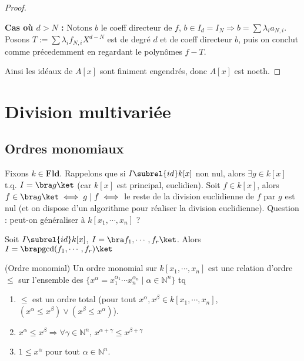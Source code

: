 \begin{proof}
\begin{enumerate}
                \textbf{Cas où $d > N$ :} Notons $b$ le coeff directeur de $f$, $b \in I_d = I_N \Rightarrow b = \sum \lambda_i a_{N,i}$. Posons $T := \sum \lambda_i f_{N,i}X^{d-N}$ est de degré $d$ et de coeff directeur $b$, puis on conclut comme précedemment en regardant le polynômes $f - T$.
            \end{enumerate}
            Ainsi les idéaux de $A[x]$ sont finiment engendrés, donc $A[x]$ est noeth.
        \end{proof}

    \section{Division multivariée}
        \subsection{Ordres monomiaux}
            Fixons $k \in \mathbf{Fld}$. Rappelons que si $I \subrel{id} k[x]$ non nul, alors $\exists g \in k[x]$ t.q. $I = \bra g \ket$ (car $k[x]$ est principal, euclidien). Soit $f \in k[x]$, alors $f \in \bra g \ket \iff g \mid f \iff $ le reste de la division euclidienne de $f$ par $g$ est nul (et on dispose d'un algorithme pour réaliser la division euclidienne). Question : peut-on généraliser à $k[x_1, \cdots, x_n]$ ? 
            \begin{remq}
                Soit $I \subrel{id} k[x]$, $I = \bra f_1, \cdots, f_r \ket$. Alors $I = \bra \mathrm{pgcd}(f_1, \cdots, f_r) \ket$
            \end{remq}
            \begin{defi} (Ordre monomial)
                \label{ordre_mono}
                Un ordre monomial sur $k[x_1, \cdots, x_n]$ est une relation d'ordre $\leq$ sur l'ensemble des $\{x^\alpha = x_1^{\alpha_1} \cdots x_n^{\alpha_n} \mid \alpha \in \mathbb{N}^n\}$ tq
                \begin{enumerate}
                    \item $\leq$ est un ordre total (pour tout $x^\alpha, x^\beta \in k[x_1, \cdots, x_n]$, $(x^\alpha \leq x^\beta) \lor (x^\beta \leq x^\alpha)$).
                    \item $x^\alpha \leq x^\beta \Rightarrow \forall \gamma \in \mathbb{N}^n,\, x^{\alpha + \gamma} \leq x^{\beta + \gamma}$
                    \item $1 \leq x^\alpha$ pour tout $\alpha \in \mathbb{N}^n$.
                \end{enumerate}
            \end{defi}
